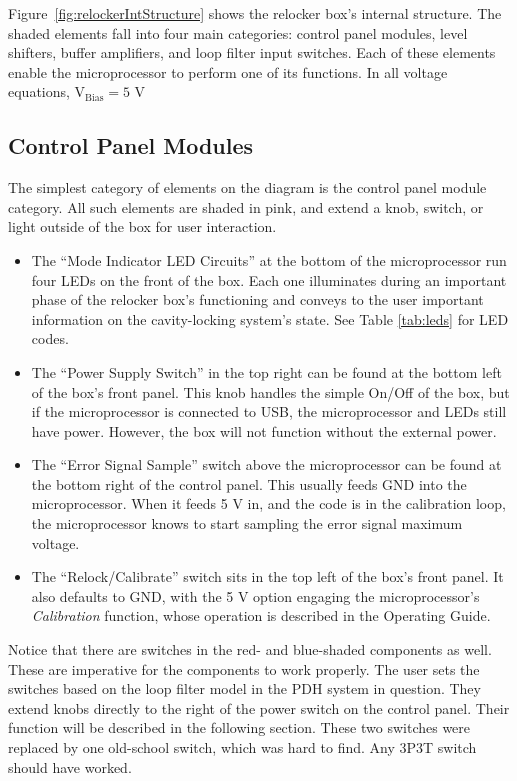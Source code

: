 \documentclass[10pt]{report}
\begin{document}
Figure~\ref{fig:relockerIntStructure} shows the relocker box's internal structure. The shaded elements fall into four main categories: control panel modules, level shifters, buffer amplifiers, and loop filter input switches. Each of these elements enable the microprocessor to perform one of its functions. In all voltage equations, $\text{V}_{\text{Bias}}=5$ V

\subsection{Control Panel Modules}

The simplest category of elements on the diagram is the control panel module category. All such elements are shaded in pink, and extend a knob, switch, or light outside of the box for user interaction.

\begin{itemize}
    \item The ``Mode Indicator LED Circuits'' at the bottom of the microprocessor run four LEDs on the front of the box. Each one illuminates during an important phase of the relocker box's functioning and conveys to the user important information on the cavity-locking system's state. See Table \ref{tab:leds} for LED codes.
    \item The ``Power Supply Switch'' in the top right can be found at the bottom left of the box's front panel. This knob handles the simple On/Off of the box, but if the microprocessor is connected to USB, the microprocessor and LEDs still have power. However, the box will not function without the external power.
    \item The ``Error Signal Sample'' switch above the microprocessor can be found at the bottom right of the control panel. This usually feeds GND into the microprocessor. When it feeds 5 V in, and the code is in the calibration loop, the microprocessor knows to start sampling the error signal maximum voltage.
    \item The ``Relock/Calibrate'' switch sits in the top left of the box's front panel. It also defaults to GND, with the 5 V option engaging the microprocessor's \textit{Calibration} function, whose operation is described in the Operating Guide.
\end{itemize}

Notice that there are switches in the red- and blue-shaded components as well. These are imperative for the components to work properly. The user sets the switches based on the loop filter model in the PDH system in question. They extend knobs directly to the right of the power switch on the control panel. Their function will be described in the following section. These two switches were replaced by one old-school switch, which was hard to find. Any 3P3T switch should have worked.
\end{document}
